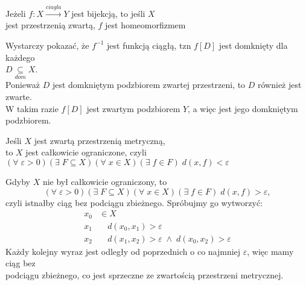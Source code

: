 \begin{center}\large
    Jeżeli $f:X\xrightarrow{ciagla} Y$ jest bijekcją, to jeśli $X$ \\jest przestrzenią zwartą, {\color{def}$f$ jest homeomorfizmem}
\end{center}
\dowod
Wystarczy pokazać, że $f^{-1}$ jest funkcją ciągłą, tzn $f[D]$ jest domknięty dla każdego \\$D\underset{dom}\subseteq X$. \medskip\\
Ponieważ $D$ jest domkniętym podzbiorem zwartej przestrzeni, to $D$ również jest zwarte. \\W takim razie $f[D]$ jest zwartym podzbiorem $Y$, a więc jest jego domkniętym podzbiorem.
\kondow
{}\bigskip
\begin{center}\large
    Jeśli $X$ jest zwartą przestrzenią metryczną, \\to {\color{def}$X$ jest całkowicie ograniczone}, czyli\smallskip\\
    $(\forall\;\varepsilon>0)(\exists\;F\subseteq X)(\forall\;x\in X)(\exists\;f\in F)\;d(x, f)<\varepsilon$
\end{center}
\dowod
Gdyby $X$ nie był całkowicie ograniczony, to
$$(\forall\;\varepsilon>0)(\exists\;F\subseteq X)(\forall\;x\in X)(\exists\;f\in F)\;d(x, f)>\varepsilon,$$
czyli istnałby ciąg bez podciągu zbieżnego. Spróbujmy go wytworzyć:
\begin{align*}
    x_0&\in X\\
    x_1&\quad d(x_0, x_1)>\varepsilon\\
    x_2&\quad d(x_1, x_2)>\varepsilon\;\land\;d(x_0, x_2)>\varepsilon
\end{align*}
Każdy kolejny wyraz jest odległy od poprzednich o co najmniej $\varepsilon$, więc mamy ciąg bez \\podciągu zbieżnego, co jest sprzeczne ze zwartością przestrzeni metrycznej.
\kondow